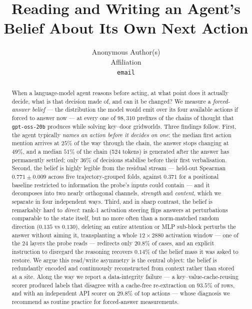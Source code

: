 \documentclass{article}
\title{Reading and Writing an Agent's Belief About Its Own Next Action}
\author{%
  Anonymous Author(s) \\
  Affiliation \\
  \texttt{email} \\
}
\begin{document}
\maketitle

\begin{abstract}
When a language-model agent reasons before acting, at what point does it actually decide,
what is that decision made of, and can it be changed? We measure a
\emph{forced-answer belief} --- the distribution the model would emit over its four
available actions if forced to answer now --- at every one of $98{,}310$ prefixes of the
chains of thought that \texttt{gpt-oss-20b} produces while solving key--door gridworlds.
Three findings follow. First, the agent typically \emph{names an action before it decides
on one}: the median first action mention arrives at $25\%$ of the way through the chain,
the answer stops changing at $49\%$, and a median $51\%$ of the chain (524 tokens) is
generated after the answer has permanently settled; only $36\%$ of decisions stabilise
before their first verbalisation. Second, the belief is highly legible from the residual
stream --- held-out Spearman $0.771 \pm 0.009$ across five trajectory-grouped folds,
against $0.371$ for a positional baseline restricted to information the probe's inputs
could contain --- and it decomposes into two nearly orthogonal channels, \emph{strength}
and \emph{content}, which we separate in four independent ways. Third, and in sharp
contrast, the belief is remarkably hard to \emph{direct}: rank-1 activation steering flips answers at perturbations
comparable to the state itself, but no more often than a norm-matched random direction
($0.135$ vs $0.130$), deleting an
entire attention or MLP sub-block perturbs the answer without aiming it, transplanting a whole
$12{\times}2880$ activation window --- one of the $24$ layers the probe reads --- redirects
only $20.8\%$ of cases, and an
explicit instruction to disregard the reasoning recovers $0.14\%$ of the belief mass it
was asked to restore. We argue this read/write asymmetry is the central object: the belief
is redundantly encoded and continuously reconstructed from context rather than stored at a
site. Along the way we report a data-integrity failure --- a key--value-cache-reusing
scorer produced labels that disagree with a cache-free re-extraction on $93.5\%$ of rows,
and with an independent API scorer on $29.8\%$ of top actions --- whose diagnosis we
recommend as routine practice for forced-answer measurements.
\end{abstract}
\end{document}
